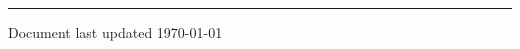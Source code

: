 \documentclass[10pt,a4paper]{article}
\newcommand*\roottitle[1]{\subsection*{#1}\vspace{-0.3em}\nopagebreak[4]}
\newcommand*\acr[1]{\textscale{.85}{#1}}
\newlength{\tripleparindent}
\newcommand{\breakvspace}[1]{\pagebreak[2]\vspace{#1}\pagebreak[2]}
\newcommand{\nobreakvspace}[1]{\nopagebreak[4]\vspace{#1}\nopagebreak[4]}
\newcommand{\spacedhrule}[2]{\breakvspace{#1}\hrule\nobreakvspace{#2}}
\newcommand{\headerone}[1] {\textscale{1.2}{\textbf{#1}}\vspace{0.7em}\nopagebreak[4]}
\newcommand{\headertwo}[1]{\vspace{0.5em}\nopagebreak[4]\textbf{#1}\nopagebreak[4]\vspace{0.1em}} %
\newcommand{\projectLine}[2]{\vspace{-0.4em}\begin{basedescript}{\setlength{\leftmargin}{\tripleparindent}}\item[\hspace{\tripleparindent}\textbf{#1}]#2\end{basedescript}\vspace{-0.5em}}
\begin{document}
   

 
    
\spacedhrule{1.5em}{-0.4em}




   


    


\vfill  

{\footnotesize Document last updated \today}
\end{document}
